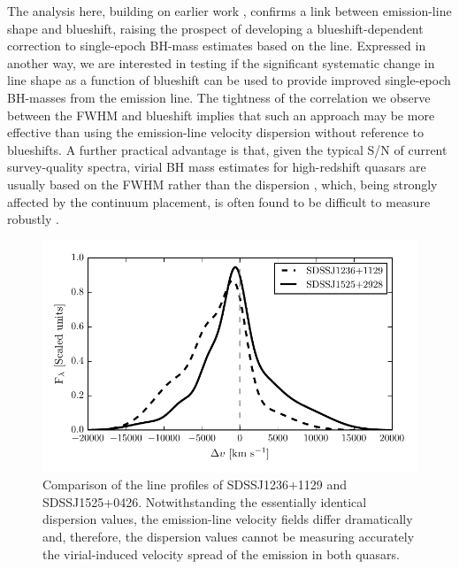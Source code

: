 The analysis here, building on earlier work \citep[including][]{shen12, sulentic07}, confirms a link between  emission-line shape and blueshift, raising the prospect of developing a blueshift-dependent correction to single-epoch BH-mass estimates based on the  line. 
Expressed in another way, we are interested in testing if the significant systematic change in line shape as a function of  blueshift can be used to provide improved single-epoch BH-masses from the  emission line.  
The tightness of the correlation we observe between the  FWHM and blueshift implies that such an approach may be more effective than using the  emission-line velocity dispersion without reference to blueshifts.
A further practical advantage is that, given the typical S/N of current survey-quality spectra, virial BH mass estimates for high-redshift quasars are usually based on the FWHM rather than the dispersion \citep[e.g.][]{shen11}, which, being strongly affected by the continuum placement, is often found to be difficult to measure robustly \citep[e.g.][]{mejia-restrepo16}. 

\begin{figure}
    \includegraphics[width=\linewidth]{figures/chapter02/civ_comparison.pdf} 
    \caption[{Comparison of the  line profiles of SDSSJ1236+1129 and SDSSJ1525+0426.}]{Comparison of the  line profiles of SDSSJ1236+1129 and SDSSJ1525+0426. Notwithstanding the essentially identical dispersion values, the emission-line velocity fields differ dramatically and, therefore, the dispersion values cannot be measuring accurately the virial-induced velocity spread of the  emission in both quasars. }
    \label{fig:civ_comparison}
\end{figure}

